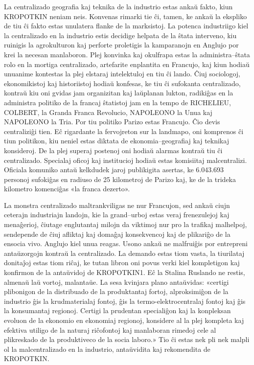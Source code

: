 La centralizado geografia kaj teknika de la industrio estas ankaŭ fakto, kiun KROPOTKIN neniam neis. Konvenas rimarki tie ĉi, tamen, ke ankaŭ la ekspliko de tiu ĉi fakto estas unulatera flanke de la marksistoj. La potenca industriigo kiel la centralizado en la industrio estis decidige helpata de la ŝtata interveno, kiu ruinigis la agrokulturon kaj perforte proletigis la kamparanojn en Anglujo por krei la necesan manlaboron. Plej konvinka kaj okulfrapa estas la administra–ŝtata rolo en la mortiga centralizado, artefarite enplantita en Francujo, kaj kiun hodiaŭ unuanime kontestas la plej elstaraj intelektuloj en tiu ĉi lando. Ĉiuj sociologoj, ekonomikistoj kaj historiistoj hodiaŭ konfesas, ke tiu ĉi sufokanta centralizado, kontraŭ kiu oni gvidas jam organizitan kaj laŭplanan lukton, radikiĝas en la administra politiko de la francaj ŝtatistoj jam en la tempo de RICHELIEU, COLBERT, la Granda Franca Revolucio, NAPOLEONO la Unua kaj NAPOLEONO la Tria. Por tiu politiko Parizo estas Francujo. Ĉio devis centraliziĝi tien. Eĉ rigardante la fervojreton sur la landmapo, oni komprenos ĉi tiun politikon, kiu neniel estas diktata de ekonomia–geografiaj kaj teknikaj konsideroj. De la plej superaj postenoj oni hodiaŭ alarmas kontraŭ tiu ĉi centralizado. Specialaj oficoj kaj institucioj hodiaŭ estas komisiitaj malcentralizi. Oficiala komuniko antaŭ kelkdudek jaroj publikigita asertas, ke 6.043.693 personoj sufokiĝas en radiuso de 25 kilometroj de Parizo kaj, ke de la trideka kilometro komenciĝas «la franca dezerto».

La monstra centralizado maltrankviligas ne nur Francujon, sed ankaŭ ciujn ceterajn industriajn landojn, kie la grand–urboj estas veraj frenezulejoj kaj menaĝerioj, ĉiutage englutantaj milojn da viktimoj nur pro la trafikaj malhelpoj, sendepende de ĉiuj afliktaj kaj domaĝaj konsekvencoj kaj de plikariĝo de la ensocia vivo. Anglujo kiel unua reagas. Usono ankaŭ ne malfruiĝis por entrepreni antaŭzorgojn kontraŭ la centralizado. La demando estas tiom vasta, la tiurilataj donitaĵoj estas tiom riĉaj, ke tutan libron oni povus verki kiel kompletigon kaj konfirmon de la antaŭvidoj de KROPOTKIN1. Eĉ la Stalina Ruslando ne restis, almenaŭ laŭ vortoj, malantaŭe. La sesa kvinjara plano antaŭvidas: «certigi plibonigon de la distribuado de la produktantaj fortoj, alproksimiĝon de la industrio ĝis la krudmaterialaj fontoj, ĝis la termo-elektrocentralaj fontoj kaj ĝis la konsumantaj regionoj. Certigi la prudentan specialiĝon kaj la konpleksan evoluon de la ekonomio en ekonomiaj regionoj, konsidere al la plej kompleta kaj efektiva utiligo de la naturaj riĉofontoj kaj manlaboran rimedoj cele al plikreskado de la produktiveco de la socia laboro.» Tio ĉi estas nek pli nek malpli ol la malcentralizado en la industrio, antaŭvidita kaj rekomendita de KROPOTKIN.

